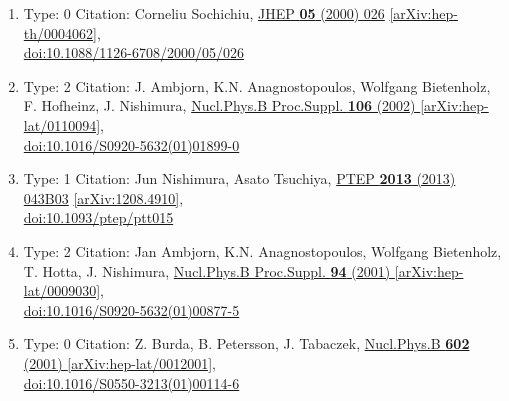 \documentclass[a4paper,10pt]{article}
\begin{document}
\begin{enumerate}
\begin{enumerate}
  \item Type: 0 Citation: Corneliu Sochichiu, \href{https://www.doi.org/10.1088/1126-6708/2000/05/026}{JHEP {\bf 05} (2000) 026}  \href{https://arxiv.org/abs/hep-th/0004062}{[arXiv:hep-th/0004062]},\\\href{https://www.doi.org/10.1088/1126-6708/2000/05/026}{doi:10.1088/1126-6708/2000/05/026}
  \item Type: 2 Citation: J. Ambjorn, K.N. Anagnostopoulos, Wolfgang Bietenholz, F. Hofheinz, J. Nishimura, \href{https://www.doi.org/10.1016/S0920-5632(01)01899-0}{Nucl.Phys.B Proc.Suppl. {\bf 106} (2002) }  \href{https://arxiv.org/abs/hep-lat/0110094}{[arXiv:hep-lat/0110094]},\\\href{https://www.doi.org/10.1016/S0920-5632(01)01899-0}{doi:10.1016/S0920-5632(01)01899-0}
  \item Type: 1 Citation: Jun Nishimura, Asato Tsuchiya, \href{https://www.doi.org/10.1093/ptep/ptt015}{PTEP {\bf 2013} (2013) 043B03}  \href{https://arxiv.org/abs/1208.4910}{[arXiv:1208.4910]},\\\href{https://www.doi.org/10.1093/ptep/ptt015}{doi:10.1093/ptep/ptt015}
  \item Type: 2 Citation: Jan Ambjorn, K.N. Anagnostopoulos, Wolfgang Bietenholz, T. Hotta, J. Nishimura, \href{https://www.doi.org/10.1016/S0920-5632(01)00877-5}{Nucl.Phys.B Proc.Suppl. {\bf 94} (2001) }  \href{https://arxiv.org/abs/hep-lat/0009030}{[arXiv:hep-lat/0009030]},\\\href{https://www.doi.org/10.1016/S0920-5632(01)00877-5}{doi:10.1016/S0920-5632(01)00877-5}
  \item Type: 0 Citation: Z. Burda, B. Petersson, J. Tabaczek, \href{https://www.doi.org/10.1016/S0550-3213(01)00114-6}{Nucl.Phys.B {\bf 602} (2001) }  \href{https://arxiv.org/abs/hep-lat/0012001}{[arXiv:hep-lat/0012001]},\\\href{https://www.doi.org/10.1016/S0550-3213(01)00114-6}{doi:10.1016/S0550-3213(01)00114-6}

\end{enumerate}
\end{enumerate}
\end{document}
